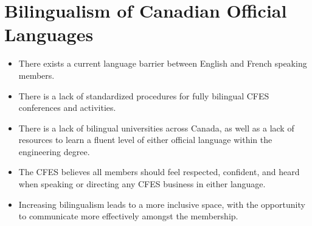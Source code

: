\section{Bilingualism of Canadian Official Languages}\label{bilingualism-of-canadian-official-languages}



\begin{itemize}
 \item There exists a current language barrier between English and French speaking members.
 \item There is a lack of standardized procedures for fully bilingual CFES conferences and activities.
 \item There is a lack of bilingual universities across Canada, as well as a lack of resources to learn a fluent level of either official language within the engineering degree.
 \item The CFES believes all members should feel respected, confident, and heard when speaking or directing any CFES business in either language.
 \item Increasing bilingualism leads to a more inclusive space, with the opportunity to communicate more effectively amongst the membership.
\end{itemize}

